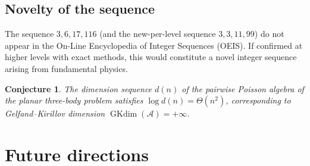 \documentclass[11pt,a4paper]{article}
\newtheorem{conjecture}[theorem]{Conjecture}
\theoremstyle{remark}
\newcommand{\cA}{\mathcal{A}}
\DeclareMathOperator{\GKdim}{GKdim}
\begin{document}
\subsection{Novelty of the sequence}

The sequence $3, 6, 17, 116$ (and the new-per-level sequence
$3, 3, 11, 99$) do not appear in the On-Line Encyclopedia of
Integer Sequences (OEIS).  If confirmed at higher levels with
exact methods, this would constitute a novel integer sequence
arising from fundamental physics.

\begin{conjecture}
The dimension sequence $d(n)$ of the pairwise Poisson algebra
of the planar three-body problem satisfies
$\log d(n) = \Theta(n^2)$, corresponding to Gelfand--Kirillov
dimension $\GKdim(\cA) = +\infty$.
\end{conjecture}


\section{Future directions}
\end{document}
